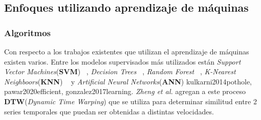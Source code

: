 
	\subsection{Enfoques utilizando aprendizaje de máquinas}
		\subsubsection{Algoritmos}
			Con respecto a los trabajos existentes que utilizan el aprendizaje de máquinas existen varios. Entre los modelos supervisados
			más utilizados están \emph{Support Vector Machines}(\textbf{SVM}) ~, \emph{Decision Trees} ~, \emph{Random Forest} ~, \emph{K-Nearest Neighboors}(\textbf{KNN})
			~ y \emph{Artificial Neural Networks}(\textbf{ANN}) \brackcite
			{kulkarni2014pothole, pawar2020efficient, gonzalez2017learning}. \emph{Zheng et al.}  agregan a este proceso
			\textbf{DTW}(\emph{Dynamic Time Warping}) que se utiliza para determinar similitud entre 2 series temporales que puedan ser obtenidas
			a distintas velocidades. 

